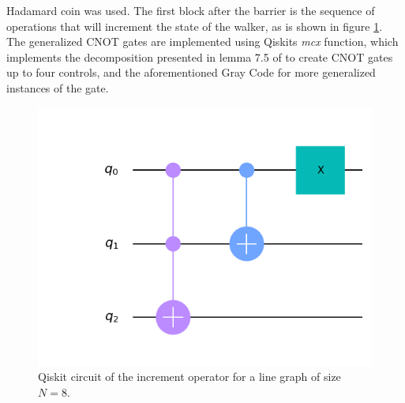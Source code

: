 \documentclass[../../dissertation.tex]{subfiles}
\begin{document}
Hadamard coin was used. The first block after the barrier is the sequence of
operations that will increment the state of the walker, as is shown in figure
\ref{fig:incrCircuitQistkit}. The generalized CNOT gates are implemented using
Qiskits \textit{mcx} function, which implements the decomposition presented in
lemma 7.5 of \cite{barenco95} to create CNOT gates up to four controls, and the
aforementioned Gray Code for more generalized instances of the gate.
\begin{figure}[!h]
	\centering
	\includegraphics[scale=0.32]{img/Qiskit/CoinedQuantumWalk/Circuits/circIncr_N3_S3.png}
	\caption{Qiskit circuit of the increment operator for a line graph of size $N=8$.} 
	\label{fig:incrCircuitQistkit}
\end{figure}\par
\end{document}
